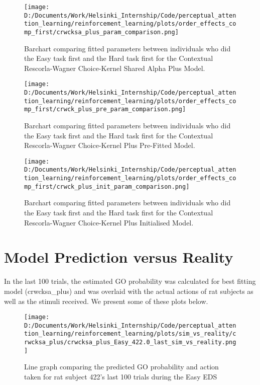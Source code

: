 \documentclass[12pt]{article}
\newcommand{\scale}{0.4}
\newcommand{\scaletwo}{0.35}
\begin{document}
\begin{figure}[h]  %
	\centering
	\texttt{[image: D:/Documents/Work/Helsinki\_Internship/Code/perceptual\_attention\_learning/reinforcement\_learning/plots/order\_effects\_comp\_first/crwcksa\_plus\_param\_comparison.png]}  %
	\caption{Barchart comparing fitted parameters between individuals who did the Easy task first and the Hard task first for the Contextual Rescorla-Wagner Choice-Kernel Shared Alpha Plus Model.}
	\label{fig:crwcksa_plus_model_effects}
\end{figure} 

\begin{figure}[h]  %
	\centering
	\texttt{[image: D:/Documents/Work/Helsinki\_Internship/Code/perceptual\_attention\_learning/reinforcement\_learning/plots/order\_effects\_comp\_first/crwck\_plus\_pre\_param\_comparison.png]}  %
	\caption{Barchart comparing fitted parameters between individuals who did the Easy task first and the Hard task first for the Contextual Rescorla-Wagner Choice-Kernel Plus Pre-Fitted Model.}
	\label{fig:crwck_plus_pre_model_effects}
\end{figure} 

\begin{figure}[h]  %
	\centering
	\texttt{[image: D:/Documents/Work/Helsinki\_Internship/Code/perceptual\_attention\_learning/reinforcement\_learning/plots/order\_effects\_comp\_first/crwck\_plus\_init\_param\_comparison.png]}  %
	\caption{Barchart comparing fitted parameters between individuals who did the Easy task first and the Hard task first for the Contextual Rescorla-Wagner Choice-Kernel Plus Initialised Model.}
	\label{fig:crwck_plus_init_model_effects}
\end{figure} 

\clearpage

\section{Model Prediction versus Reality}
In the last 100 trials, the estimated GO probability was calculated for best fitting model (crwcksa\_plus) and was overlaid with the actual actions of rat subjects as well as the stimuli received. We present some of these plots below.

\begin{figure}[h]  %
	\centering
	\texttt{[image: D:/Documents/Work/Helsinki\_Internship/Code/perceptual\_attention\_learning/reinforcement\_learning/plots/sim\_vs\_reality/crwcksa\_plus/crwcksa\_plus\_Easy\_422.0\_last\_sim\_vs\_reality.png]}  %
	\caption{Line graph comparing the predicted GO probability and action taken for rat subject 422's last 100 trials during the Easy EDS}
	\label{fig:422_easy}
\end{figure} 
\end{document}

